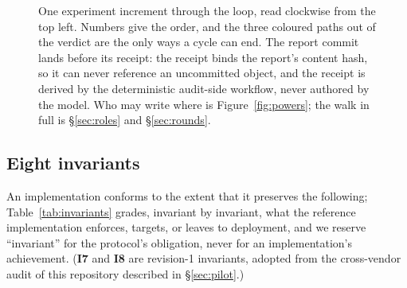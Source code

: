 \documentclass[11pt]{article}
\newcommand{\invariant}[1]{\textbf{I#1}}
\begin{document}
\begin{figure}[!tp]
{}
\caption{One experiment increment through the loop, read clockwise from the top left. Numbers give the order, and the three coloured paths out of the verdict are the only ways a cycle can end. The report commit lands before its receipt: the receipt binds the report's content hash, so it can never reference an uncommitted object, and the receipt is derived by the deterministic audit-side workflow, never authored by the model. Who may write where is Figure~\ref{fig:powers}; the walk in full is \S\ref{sec:roles} and \S\ref{sec:rounds}.}
\label{fig:arch}
\end{figure}

\subsection{Eight invariants}\label{sec:invariants}

An implementation conforms to the extent that it preserves the following; Table~\ref{tab:invariants} grades, invariant by invariant, what the reference implementation enforces, targets, or leaves to deployment, and we reserve ``invariant'' for the protocol's obligation, never for an implementation's achievement. (\invariant{7} and \invariant{8} are revision-1 invariants, adopted from the cross-vendor audit of this repository described in \S\ref{sec:pilot}.)
\end{document}
